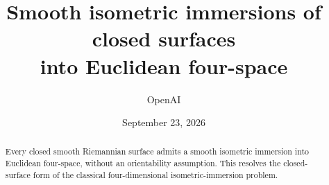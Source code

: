 \documentclass[11pt]{article}
\title{Smooth isometric immersions of closed surfaces\\into Euclidean four-space}
\author{OpenAI}
\date{September 23, 2026}
\theoremstyle{definition}
\theoremstyle{remark}
\numberwithin{equation}{section}
\begin{document}
\maketitle
\begin{abstract}
Every closed smooth Riemannian surface admits a smooth isometric immersion into
Euclidean four-space, without an orientability assumption. This resolves the
closed-surface form of the classical four-dimensional isometric-immersion problem.
\end{abstract}
\tableofcontents









\clearpage


\end{document}
